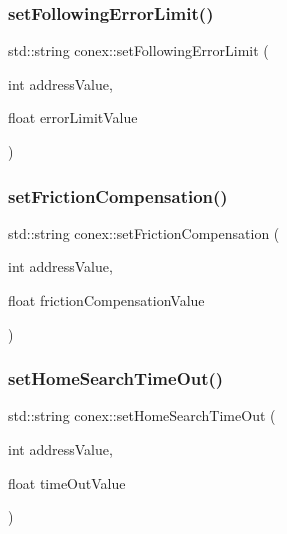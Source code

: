 \mbox{\label{namespaceconex_aecd28d691655d6fa73f28b2dd5922f8e}} 
\subsubsection{\texorpdfstring{set\+Following\+Error\+Limit()}{setFollowingErrorLimit()}}
{\footnotesize\ttfamily std\+::string conex\+::set\+Following\+Error\+Limit (\begin{DoxyParamCaption}\item[{int}]{address\+Value,  }\item[{float}]{error\+Limit\+Value }\end{DoxyParamCaption})}

\mbox{\label{namespaceconex_a45b737635000384b926ab6e2bd829865}} 
\subsubsection{\texorpdfstring{set\+Friction\+Compensation()}{setFrictionCompensation()}}
{\footnotesize\ttfamily std\+::string conex\+::set\+Friction\+Compensation (\begin{DoxyParamCaption}\item[{int}]{address\+Value,  }\item[{float}]{friction\+Compensation\+Value }\end{DoxyParamCaption})}

\mbox{\label{namespaceconex_a55f14dbf89cbe71b6d0934eef1a97d1b}} 
\subsubsection{\texorpdfstring{set\+Home\+Search\+Time\+Out()}{setHomeSearchTimeOut()}}
{\footnotesize\ttfamily std\+::string conex\+::set\+Home\+Search\+Time\+Out (\begin{DoxyParamCaption}\item[{int}]{address\+Value,  }\item[{float}]{time\+Out\+Value }\end{DoxyParamCaption})}

